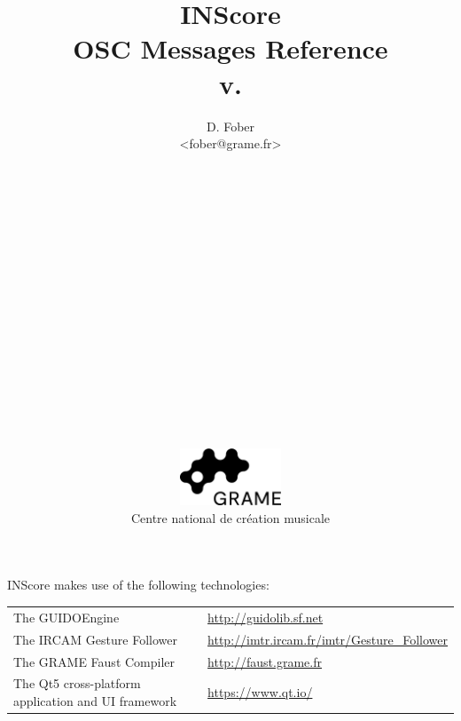 \documentclass[a4paper,twoside]{report}
\begin{document}
\title{\vspace*{5cm}
INScore \\ OSC Messages Reference \\v.\inscoreversion}

\author{D. Fober\\ 
{\small <fober@grame.fr>} \\
\\
\\
\\
\\
\\
\\
\\
\\
\\
\\
\\
\\
\\
\\
\\
\\
\\
\includegraphics[width=30mm]{imgs/Logo_Grame}\\
Centre national de création musicale\\
}
\date{}

\maketitle

\vspace*{19.5cm}
 
{\small INScore makes use of the following technologies:}
\begin{table}[h]
\begin{tabular}{ll}
{\small The GUIDOEngine}  					& {\small \url{http://guidolib.sf.net}} \\
{\small The IRCAM Gesture Follower} 		& {\small \url{http://imtr.ircam.fr/imtr/Gesture_Follower}} \\
{\small The GRAME Faust Compiler} 		& {\small \url{http://faust.grame.fr}} \\
{\small The Qt5 cross-platform application and UI framework} & {\small \url{https://www.qt.io/}}
\end{tabular}
\end{table}%
\end{document}
